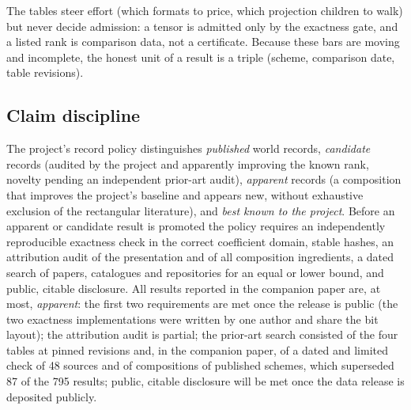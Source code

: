 The tables steer effort (which formats to price, which projection children to walk) but never decide admission: a tensor is admitted only by the exactness gate, and a listed rank is comparison data, not a certificate.
Because these bars are moving and incomplete, the honest unit of a result is a triple (scheme, comparison date, table revisions).

\subsection{Claim discipline}
The project's record policy distinguishes \emph{published} world records, \emph{candidate} records (audited by the project and apparently improving the known rank, novelty pending an independent prior-art audit), \emph{apparent} records (a composition that improves the project's baseline and appears new, without exhaustive exclusion of the rectangular literature),
and \emph{best known to the project}. Before an apparent or candidate result is promoted the policy requires an independently reproducible exactness check in the correct coefficient domain, stable hashes, an attribution audit of the presentation and of all composition ingredients, a dated search of papers, catalogues and repositories for an equal or lower bound, and public, citable disclosure.
All results reported in the companion paper are, at most, \emph{apparent}: the first two requirements are met once the release is public (the two exactness implementations were written by one author and share the bit layout); the attribution audit is partial; the prior-art search consisted of the four tables at pinned revisions and, in the companion paper, of a dated and limited check of 48 sources and of compositions of published schemes, which superseded 87 of the 795 results; public, citable disclosure will be met once the data release is deposited publicly.
